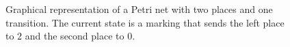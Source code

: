 \begin{figure}[t]
	\centering
	\caption{Graphical representation of a Petri net with two places and one transition. The current state is a marking that sends the left place to $2$ and the second place to $0$.}
	\label{net:sample}
\end{figure}